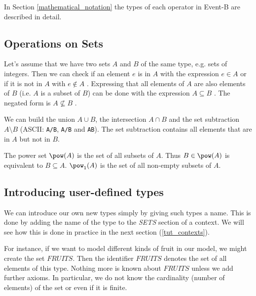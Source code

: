 
In Section \ref{mathematical_notation} the types of each operator in Event-B are described in detail.

\subsection{Operations on Sets}
\label{tut_operations_on_sets}
Let's assume that we have two sets $A$ and $B$ of the same type, e.g. sets of integers.
Then we can check if an element $e$ is in $A$ with the expression $e\in A$  or 
if it is not in $A$ with $e\notin A$ .
Expressing that all elements of $A$ are also elements of $B$ (i.e. $A$ is a subset of $B$) can
be done with the expression $A\subseteq B$ . The negated form is $A\not\subseteq B$ .

We can build the union $A\cup B$, the intersection $A\cap B$ and the set subtraction $A\setminus B$
(ASCII: \texttt{A\mybackslash{}/B}, \texttt{A/\mybackslash{}B} and \texttt{A\mybackslash{}B}). The
set subtraction contains all elements that are in $A$ but not in $B$.

The power set $\pow(A)$  is the set of all subsets of $A$.
Thus $B\in\pow(A)$ is equivalent to $B\subseteq A$.
$\pow_1(A)$  is the set of all non-empty subsets of $A$.

\subsection{Introducing user-defined types}
\label{tut_user_defined_sets}

We can introduce our own new types simply by giving such types a name.
This is done by adding the name of the type to the \textsl{SETS} section of a context.
We will see how this is done in practice in the next section (\ref{tut_contexts}).

For instance, if we want to model different kinds of fruit in our model, we might create the set $FRUITS$. Then the identifier $FRUITS$ denotes the set of all elements of this type. Nothing more is known about $FRUITS$ unless we add further axioms. In particular, we do not
know the cardinality (number of elements) of the set or even if it is finite.

